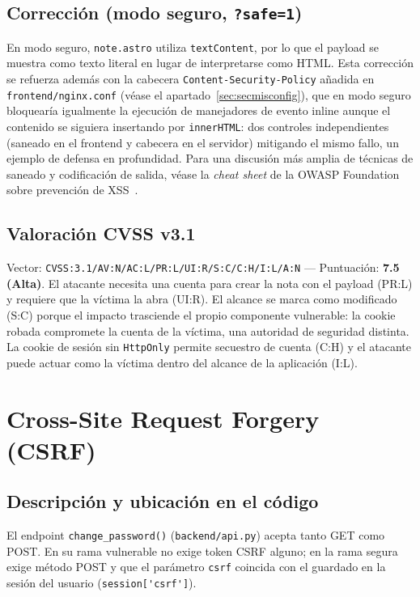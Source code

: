 \subsection{Corrección (modo seguro, \texttt{?safe=1})}

En modo seguro, \texttt{note.astro} utiliza \verb|textContent|, por lo que
el payload se muestra como texto literal en lugar de interpretarse como
HTML. Esta corrección se refuerza además con la cabecera
\texttt{Content-Security-Policy} añadida en \texttt{frontend/nginx.conf}
(véase el apartado~\ref{sec:secmisconfig}), que en modo seguro bloquearía igualmente la
ejecución de manejadores de evento inline aunque el contenido se siguiera
insertando por \verb|innerHTML|: dos controles independientes (saneado en el
frontend y cabecera en el servidor) mitigando el mismo fallo, un ejemplo de
defensa en profundidad. Para una discusión más amplia de técnicas de
saneado y codificación de salida, véase la \emph{cheat sheet} de la OWASP
Foundation sobre prevención de XSS~.

\subsection{Valoración CVSS v3.1}

Vector: \texttt{CVSS:3.1/AV:N/AC:L/PR:L/UI:R/S:C/C:H/I:L/A:N} — Puntuación:
\textbf{7.5 (Alta)}. El atacante necesita una cuenta para crear la nota con
el payload (PR:L) y requiere que la víctima la abra (UI:R). El alcance se
marca como modificado (S:C) porque el impacto trasciende el propio
componente vulnerable: la cookie robada compromete la cuenta de la víctima,
una autoridad de seguridad distinta. La cookie de sesión sin
\texttt{HttpOnly} permite secuestro de cuenta (C:H) y el atacante puede
actuar como la víctima dentro del alcance de la aplicación (I:L).

\section{Cross-Site Request Forgery (CSRF)}
\label{sec:csrf}

\subsection{Descripción y ubicación en el código}

El endpoint \verb|change_password()| (\texttt{backend/api.py}) acepta tanto
GET como POST. En su rama vulnerable no exige token CSRF alguno; en la rama
segura exige método POST y que el parámetro \texttt{csrf} coincida con el
guardado en la sesión del usuario (\verb|session['csrf']|).

